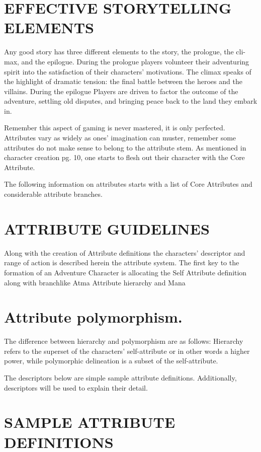 \documentclass{article}
\begin{document}
\section{EFFECTIVE STORYTELLING ELEMENTS}

	Any good story has three different elements to the story, the prologue, the cli- max, and the
epilogue. During the prologue players volunteer their adventuring spirit into the satisfaction of
their characters’ motivations. The climax speaks of the highlight of dramatic tension: the final
battle between the heroes and the villains. During the epilogue Players are driven to factor the
outcome of the adventure, settling old disputes, and bringing peace back to the land they embark
in.

	Remember this aspect of gaming is never mastered, it is only perfected. Attributes vary as widely
as ones’ imagination can muster, remember some attributes do not make sense to belong to the
attribute stem. As mentioned in character creation pg. 10, one starts to flesh out their character
with the Core Attribute.

	The following information on attributes starts with a list of Core Attributes and considerable
attribute branches.

\section{ATTRIBUTE GUIDELINES}

	Along with the creation of Attribute definitions the characters’ descriptor and range of action is
described herein the attribute system. The first key to the formation of an Adventure Character is
allocating the Self Attribute definition along with branchlike Atma Attribute hierarchy and Mana

\section{Attribute polymorphism.}

	The difference between hierarchy and polymorphism are as follows: Hierarchy refers to the
superset of the characters’ self-attribute or in other words a higher power, while polymorphic
delineation is a subset of the self-attribute.

	The descriptors below are simple sample attribute definitions. Additionally, descriptors will be
used to explain their detail.

\section{SAMPLE ATTRIBUTE DEFINITIONS}
\end{document}
